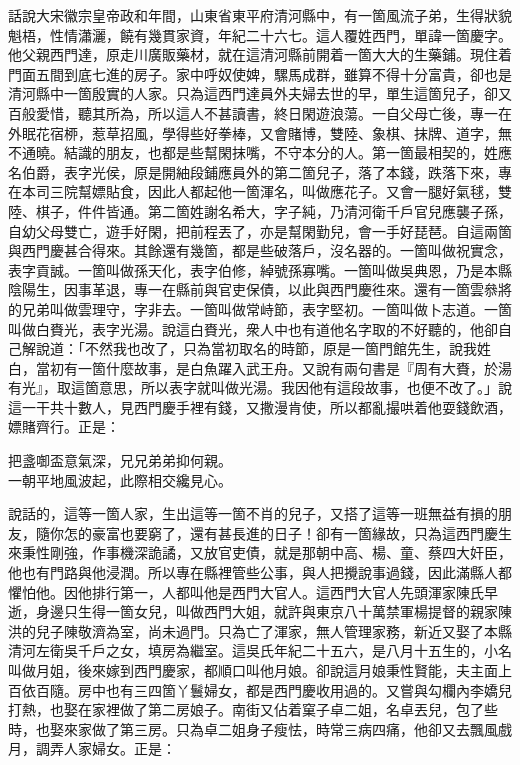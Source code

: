 話說大宋徽宗皇帝政和年間，山東省東平府清河縣中，有一箇風流子弟，生得狀貌魁梧，性情瀟灑，饒有幾貫家資，年紀二十六七。這人覆姓西門，單諱一箇慶字。他父親西門達，原走川廣販藥材，就在這清河縣前開着一箇大大的生藥鋪。現住着門面五間到底七進的房子。家中呼奴使婢，騾馬成群，雖算不得十分富貴，卻也是清河縣中一箇殷實的人家。只為這西門達員外夫婦去世的早，單生這箇兒子，卻又百般愛惜，聽其所為，所以這人不甚讀書，{}終日閑遊浪蕩。一自父母亡後，專一在外眠花宿桺，惹草招風，學得些好拳棒，又會賭博，雙陸、象棋、抹牌、道字，無不通曉。結識的朋友，也都是些幫閑抹嘴，不守本分的人。第一箇最相契的，姓應名伯爵，表字光侯，原是開紬段鋪應員外的第二箇兒子，落了本錢，跌落下來，專在本司三院幫嫖貼食，因此人都起他一箇渾名，叫做應花子。又會一腿好氣毬，雙陸、棋子，件件皆通。{}第二箇姓謝名希大，字子純，乃清河衛千戶官兒應襲子孫，自幼父母雙亡，遊手好閑，把前程丟了，亦是幫閑勤兒，會一手好琵琶。自這兩箇與西門慶甚合得來。其餘還有幾箇，都是些破落戶，沒名器的。一箇叫做祝實念，表字貢誠。一箇叫做孫天化，表字伯修，綽號孫寡嘴。一箇叫做吳典恩，乃是本縣陰陽生，因事革退，專一在縣前與官吏保債，以此與西門慶徃來。還有一箇雲叅將的兄弟叫做雲理守，字非去。一箇叫做常峙節，表字堅初。一箇叫做卜志道。一箇叫做白賚光，表字光湯。說這白賚光，衆人中也有道他名字取的不好聽的，他卻自己解說道：「不然我也改了，只為當初取名的時節，原是一箇門館先生，說我姓白，當初有一箇什麼故事，是白魚躍入武王舟。又說有兩句書是『周有大賚，於湯有光』，取這箇意思，所以表字就叫做光湯。我因他有這段故事，也便不改了。」{}說這一干共十數人，見西門慶手裡有錢，又撒漫肯使，所以都亂撮哄着他耍錢飲酒，嫖賭齊行。正是：

\begin{myquote}
把盞啣盃意氣深，兄兄弟弟抑何親。\\
一朝平地風波起，此際相交纔見心。
\end{myquote}

說話的，這等一箇人家，生出這等一箇不肖的兒子，又搭了這等一班無益有損的朋友，隨你怎的豪富也要窮了，還有甚長進的日子！卻有一箇緣故，只為這西門慶生來秉性剛強，作事機深詭譎，又放官吏債，就是那朝中高、楊、童、蔡四大奸臣，他也有門路與他浸潤。{}所以專在縣裡管些公事，與人把攪說事過錢，因此滿縣人都懼怕他。因他排行第一，人都叫他是西門大官人。這西門大官人先頭渾家陳氏早逝，身邊只生得一箇女兒，叫做西門大姐，就許與東京八十萬禁軍楊提督的親家陳洪的兒子陳敬濟為室，尚未過門。只為亡了渾家，無人管理家務，新近又娶了本縣清河左衛吳千戶之女，填房為繼室。這吳氏年紀二十五六，是八月十五生的，小名叫做月姐，後來嫁到西門慶家，都順口叫他月娘。卻說這月娘秉性賢能，夫主面上百依百隨。{}房中也有三四箇丫鬟婦女，都是西門慶收用過的。又嘗與勾欄內李嬌兒打熱，也娶在家裡做了第二房娘子。南街又佔着窠子卓二姐，名卓丟兒，包了些時，也娶來家做了第三房。只為卓二姐身子瘦怯，時常三病四痛，他卻又去飄風戲月，調弄人家婦女。正是：

